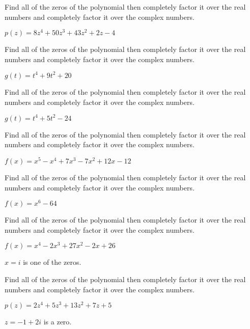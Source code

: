 \documentclass{ximera}
\begin{document}
\begin{problem}
Find all of the zeros of the polynomial then completely factor it over the real numbers and completely factor it over the complex numbers.

$p(z) = 8z^4+50z^3+43z^2+2z-4$
\end{problem}

\begin{problem}
Find all of the zeros of the polynomial then completely factor it over the real numbers and completely factor it over the complex numbers.

$g(t) = t^4+9t^2+20$
\end{problem}

\begin{problem}
Find all of the zeros of the polynomial then completely factor it over the real numbers and completely factor it over the complex numbers.

$g(t) = t^4 + 5t^2 - 24$
\end{problem}

\begin{problem}
Find all of the zeros of the polynomial then completely factor it over the real numbers and completely factor it over the complex numbers.

$f(x) = x^5 - x^4+7x^3-7x^2+12x-12$
\end{problem}

\begin{problem}
Find all of the zeros of the polynomial then completely factor it over the real numbers and completely factor it over the complex numbers.

$f(x) = x^6-64$
\end{problem}

\begin{problem}
Find all of the zeros of the polynomial then completely factor it over the real numbers and completely factor it over the complex numbers.

$f(x) = x^{4} - 2x^{3} + 27x^{2} - 2x + 26$

\begin{hint}
$x = i$ is one of the zeros.  
\end{hint}
\end{problem}

\begin{problem}\label{compfactpolylast}
Find all of the zeros of the polynomial then completely factor it over the real numbers and completely factor it over the complex numbers.

$p(z) = 2z^4+5z^3+13z^2+7z+5$ 

\begin{hint}
$z = -1+2i$ is a zero.  
\end{hint}
\end{problem} 
\end{document}

